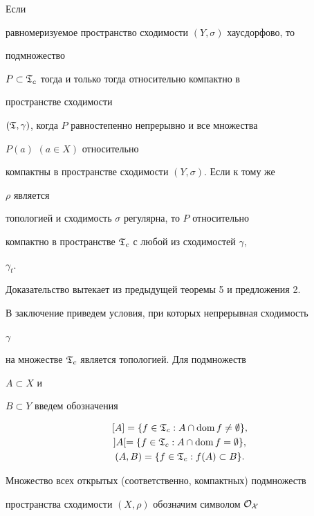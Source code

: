 \begin{cor} Если


равномеризуемое пространство сходимости $(Y,\sigma)$ хаусдорфово, то


подмножество


$P\subset\frak T_c$ тогда и только тогда относительно компактно в


пространстве сходимости


$(\frak T,\gamma)$, когда $P$ равностепенно непрерывно и все множества


$P(a)$ $(a\in X)$ относительно


компактны в пространстве сходимости $(Y,\sigma)$. Если к тому же


$\rho$ является


топологией и сходимость $\sigma$ регулярна, то $P$ относительно


компактно в пространстве $\frak T_c$ с любой из сходимостей $\gamma$,


$\gamma_t$.


\end{cor}





Доказательство вытекает из предыдущей теоремы 5 и предложения 2.





В заключение приведем условия, при которых непрерывная сходимость


$\gamma$


на множестве $\frak T_c$ является топологией. Для подмножеств


$A\subset X$ и


$B\subset Y$ введем обозначения


\begin{gather*}


[A]=\{f\in\frak T_c: A\cap\dom f\ne\emptyset\},\\


]A[=\{f\in\frak T_c: A\cap\dom f=\emptyset\},\\


(A,B)=\{f\in\frak T_c:f(A)\subset B\}.


\end{gather*}


Множество всех открытых (соответственно, компактных) подмножеств


пространства сходимости $(X,\rho)$ обозначим символом $\cal O_X$


